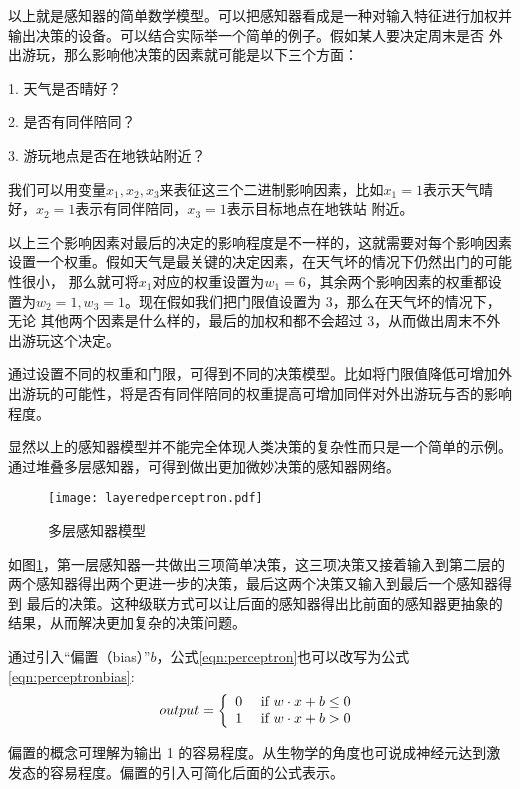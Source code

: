 以上就是感知器的简单数学模型。可以把感知器看成是一种对输入特征进行加权并输出决策的设备。可以结合实际举一个简单的例子。假如某人要决定周末是否
外出游玩，那么影响他决策的因素就可能是以下三个方面：

1. 天气是否晴好？

2. 是否有同伴陪同？

3. 游玩地点是否在地铁站附近？

我们可以用变量$x_1, x_2, x_3$来表征这三个二进制影响因素，比如$x_1 = 1$表示天气晴好，$x_2 = 1$表示有同伴陪同，$x_3 = 1$表示目标地点在地铁站
附近。

以上三个影响因素对最后的决定的影响程度是不一样的，这就需要对每个影响因素设置一个权重。假如天气是最关键的决定因素，在天气坏的情况下仍然出门的可能性很小，
那么就可将$x_1$对应的权重设置为$w_1=6$，其余两个影响因素的权重都设置为$w_2=1, w_3=1$。现在假如我们把门限值设置为 3，那么在天气坏的情况下，无论
其他两个因素是什么样的，最后的加权和都不会超过 3，从而做出周末不外出游玩这个决定。

通过设置不同的权重和门限，可得到不同的决策模型。比如将门限值降低可增加外出游玩的可能性，将是否有同伴陪同的权重提高可增加同伴对外出游玩与否的影响程度。

显然以上的感知器模型并不能完全体现人类决策的复杂性而只是一个简单的示例。通过堆叠多层感知器，可得到做出更加微妙决策的感知器网络。

\begin{figure}[h]
	\texttt{[image: layeredperceptron.pdf]}
	\caption{多层感知器模型}
	\label{layeredperceptron}
\end{figure}

如图\ref{layeredperceptron}，第一层感知器一共做出三项简单决策，这三项决策又接着输入到第二层的两个感知器得出两个更进一步的决策，最后这两个决策又输入到最后一个感知器得到
最后的决策。这种级联方式可以让后面的感知器得出比前面的感知器更抽象的结果，从而解决更加复杂的决策问题。

通过引入“偏置（bias）”$b$，公式\ref{eqn:perceptron}也可以改写为公式\ref{eqn:perceptronbias}:
\begin{equation}
	\label{eqn:perceptronbias}
output = \left\{ \begin{array} { l l } { 0 } & { \text { if } w \cdot x + b \leq 0 } \\ { 1 } & { \text { if } w \cdot x + b > 0 } \end{array} \right.
\end{equation}

偏置的概念可理解为输出 1 的容易程度。从生物学的角度也可说成神经元达到激发态的容易程度。偏置的引入可简化后面的公式表示。

